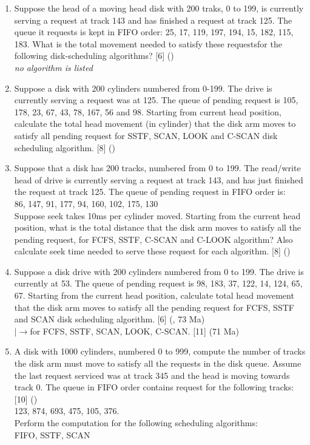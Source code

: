 \documentclass[12pt]{article}
\newcommand{\lb}{\\$\left|\rightarrow\right.$}
\begin{document}
\begin{enumerate}
			\item Suppose the head of a moving head disk with 200 traks, 0 to 199, is currently serving a request at track 143 and has finished a request at track 125. The queue it requests is kept in FIFO order: 25, 17, 119, 197, 194, 15, 182, 115, 183. What is the total movement needed to satisfy these requestsfor the following disk-scheduling algorithms? \hfill [6] ()\\
			\textit{no algorithm is listed}

			\item Suppose a disk with 200 cylinders numbered from 0-199. The drive is currently serving a request was at 125. The queue of pending request is 105, 178, 23, 67, 43, 78, 167, 56 and 98. Starting from current head position, calculate the total head movement (in cylinder) that the disk arm moves to satisfy all pending request for SSTF, SCAN, LOOK and C-SCAN disk scheduling algorithm. \hfill [8] ()

			\item Suppose that a disk has 200 tracks, numbered from 0 to 199. The read/write head of drive is currently serving a request at track 143, and has just finished the request at track 125. The queue of pending request in FIFO order is:\\
			86, 147, 91, 177, 94, 160, 102, 175, 130\\
			Suppose seek takes 10ms per cylinder moved. Starting from the current head position, what is the total distance that the disk arm moves to satisfy all the pending request, for FCFS, SSTF, C-SCAN and C-LOOK algorithm? Also calculate seek time needed to serve these request for each algorithm. \hfill [8] ()

			\item Suppose a disk drive with 200 cylinders numbered from 0 to 199. The drive is currently at 53. The queue of pending request is 98, 183, 37, 122, 14, 124, 65, 67. Starting from the current head position, calculate total head movement that the disk arm moves to satisfy all the pending request for FCFS, SSTF and SCAN disk scheduling algorithm. \hfill [6] (, 73 Ma)
			\lb for FCFS, SSTF, SCAN, LOOK, C-SCAN. \hfill [11] (71 Ma)

			\item A disk with 1000 cylinders, numbered 0 to 999, compute the number of tracks the disk arm must move to satisfy all the requests in the disk queue. Assume the last request serviced was at track 345 and the head is moving towards track 0. The queue in FIFO order contains request for the following tracks: \hfill [10] ()\\
			123, 874, 693, 475, 105, 376.\\
			Perform the computation for the following scheduling algorithms:\\
			FIFO, SSTF, SCAN


\end{enumerate}
\end{document}
